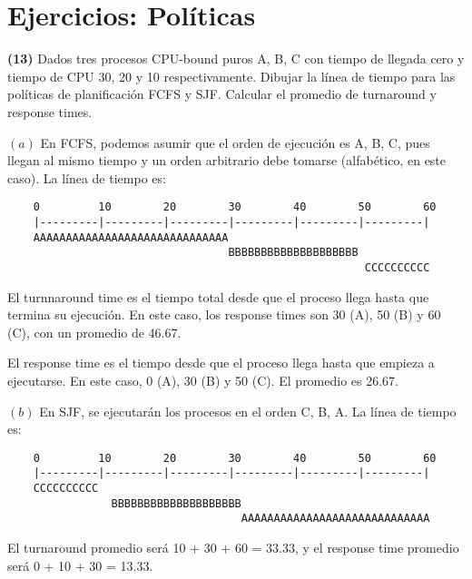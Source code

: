 \documentclass[12pt]{article}
\theoremstyle{definition}
\begin{document}
\pagebreak

\section{Ejercicios: Políticas}

\begin{shaded}
    \textbf{(13)} Dados tres procesos CPU-bound puros A, B, C con tiempo de
    llegada cero y tiempo de CPU 30, 20 y 10 respectivamente. Dibujar la línea
    de tiempo para las políticas de planificación FCFS y SJF. Calcular
    el promedio de turnaround y response times.
\end{shaded}

$(a)$ En FCFS, podemos asumir que el orden de ejecución es A, B, C, pues llegan
al mismo tiempo y un orden arbitrario debe tomarse (alfabético, en este caso).
La línea de tiempo es: 

\begin{verbatim}
    0         10        20        30        40        50        60
    |---------|---------|---------|---------|---------|---------|
    AAAAAAAAAAAAAAAAAAAAAAAAAAAAAA
                                  BBBBBBBBBBBBBBBBBBBB
                                                       CCCCCCCCCC
\end{verbatim}

El turnnaround time es el tiempo total desde que el proceso llega hasta
que termina su ejecución. En este caso, los response times son 30 (A), 50 (B) y
60 (C), con un promedio de 46.67.

El response time es el tiempo desde que el proceso llega hasta que empieza
a ejecutarse. En este caso, 0 (A), 30 (B) y 50 (C). El promedio es 26.67.

$(b)$ En SJF, se ejecutarán los procesos en el orden C, B, A. La línea de tiempo
es:

\begin{verbatim}
    0         10        20        30        40        50        60
    |---------|---------|---------|---------|---------|---------|
    CCCCCCCCCC
                BBBBBBBBBBBBBBBBBBBB
                                    AAAAAAAAAAAAAAAAAAAAAAAAAAAAA
\end{verbatim}

El turnaround promedio será 10 + 30 + 60 = 33.33, y el response time promedio
será 0 + 10 + 30 = 13.33.

\pagebreak 
\end{document}

